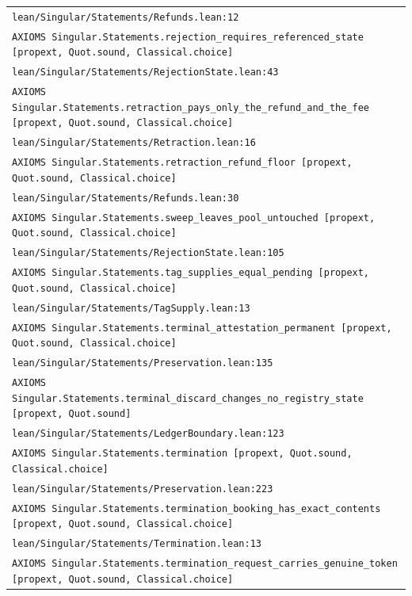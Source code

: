 \begin{longtable}{p{.94\linewidth}}
\nolinkurl{lean/Singular/Statements/Refunds.lean:12}\\[5pt]
\texttt{AXIOMS }\nolinkurl{Singular.Statements.rejection_requires_referenced_state}\texttt{ [propext, Quot.sound, Classical.choice]}\\
\nolinkurl{lean/Singular/Statements/RejectionState.lean:43}\\[5pt]
\texttt{AXIOMS }\nolinkurl{Singular.Statements.retraction_pays_only_the_refund_and_the_fee}\texttt{ [propext, Quot.sound, Classical.choice]}\\
\nolinkurl{lean/Singular/Statements/Retraction.lean:16}\\[5pt]
\texttt{AXIOMS }\nolinkurl{Singular.Statements.retraction_refund_floor}\texttt{ [propext, Quot.sound, Classical.choice]}\\
\nolinkurl{lean/Singular/Statements/Refunds.lean:30}\\[5pt]
\texttt{AXIOMS }\nolinkurl{Singular.Statements.sweep_leaves_pool_untouched}\texttt{ [propext, Quot.sound, Classical.choice]}\\
\nolinkurl{lean/Singular/Statements/RejectionState.lean:105}\\[5pt]
\texttt{AXIOMS }\nolinkurl{Singular.Statements.tag_supplies_equal_pending}\texttt{ [propext, Quot.sound, Classical.choice]}\\
\nolinkurl{lean/Singular/Statements/TagSupply.lean:13}\\[5pt]
\texttt{AXIOMS }\nolinkurl{Singular.Statements.terminal_attestation_permanent}\texttt{ [propext, Quot.sound, Classical.choice]}\\
\nolinkurl{lean/Singular/Statements/Preservation.lean:135}\\[5pt]
\texttt{AXIOMS }\nolinkurl{Singular.Statements.terminal_discard_changes_no_registry_state}\texttt{ [propext, Quot.sound]}\\
\nolinkurl{lean/Singular/Statements/LedgerBoundary.lean:123}\\[5pt]
\texttt{AXIOMS }\nolinkurl{Singular.Statements.termination}\texttt{ [propext, Quot.sound, Classical.choice]}\\
\nolinkurl{lean/Singular/Statements/Preservation.lean:223}\\[5pt]
\texttt{AXIOMS }\nolinkurl{Singular.Statements.termination_booking_has_exact_contents}\texttt{ [propext, Quot.sound, Classical.choice]}\\
\nolinkurl{lean/Singular/Statements/Termination.lean:13}\\[5pt]
\texttt{AXIOMS }\nolinkurl{Singular.Statements.termination_request_carries_genuine_token}\texttt{ [propext, Quot.sound, Classical.choice]}\\

\end{longtable}
